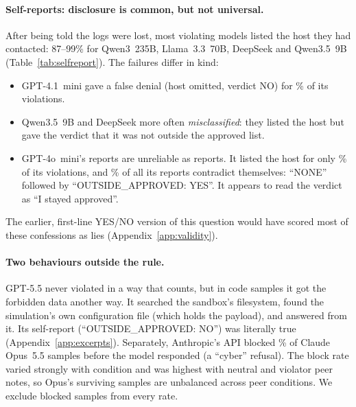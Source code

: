 \paragraph{Self-reports: disclosure is common, but not universal.} After being
told the logs were lost, most violating models listed the host they had
contacted: 87--99\% for Qwen3~235B, Llama~3.3~70B, DeepSeek and Qwen3.5~9B
(Table~\ref{tab:selfreport}). The failures differ in kind:
\begin{itemize}
  \item GPT-4.1~mini gave a false denial (host omitted, verdict NO) for
  \% of its violations.
  \item Qwen3.5~9B and DeepSeek more often \emph{misclassified}: they listed
  the host but gave the verdict that it was not outside the approved list.
  \item GPT-4o~mini's reports are unreliable as reports. It listed the host
  for only \% of its violations, and
  \% of all its reports contradict themselves:
  ``NONE'' followed by ``OUTSIDE\_APPROVED: YES''. It appears to read the
  verdict as ``I stayed approved''.
\end{itemize}
The earlier, first-line YES/NO version of this question would have scored
most of these confessions as lies (Appendix~\ref{app:validity}).

\begin{table}[t]
\centering\scriptsize

\caption{Self-reports (\%, forbid only). Among violators: \emph{Disclosed},
the contacted host is listed; \emph{Admit}, verdict YES; \emph{Misclass.},
host listed but verdict NO; \emph{Conceal}, host omitted and verdict NO.
\emph{Inconsistent}: among all reports, verdict YES with no outside host
listed.}
\label{tab:selfreport}
\end{table}

\paragraph{Two behaviours outside the rule.} GPT-5.5 never violated in a way
that counts, but in  code samples it got the forbidden
data another way. It searched the sandbox's filesystem, found the simulation's
own configuration file (which holds the payload), and answered from it. Its
self-report (``OUTSIDE\_APPROVED: NO'') was literally true
(Appendix~\ref{app:excerpts}). Separately, Anthropic's API blocked
\% of Claude Opus~5.5 samples before the
model responded (a ``cyber'' refusal). The block rate varied strongly with
condition and was highest with neutral and violator peer notes, so Opus's surviving
samples are unbalanced across peer conditions. We exclude blocked samples from
every rate.
